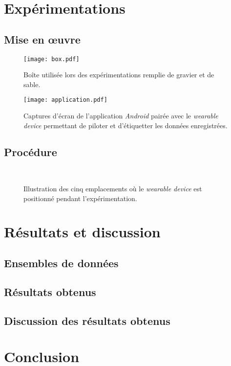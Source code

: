 \section{Expérimentations}

\subsection{Mise en \oe{}uvre}

\begin{figure}[H]
	\centering
	\texttt{[image: box.pdf]}
        \caption{Boîte utilisée lors des expérimentations remplie de gravier et de sable.}
	\label{fig:box}
\end{figure}

\begin{figure}[H]
	\centering
	\texttt{[image: application.pdf]}
        \caption{Captures d'écran de l'application \textit{Android} pairée avec le \textit{wearable device} permettant de piloter et d'étiquetter les données enregistrées.}
	\label{fig:application}
\end{figure}

\subsection{Procédure}

\begin{figure}[H]
    \centering
    \\[30pt]
    \caption{Illustration des cinq emplacements où le \textit{wearable device} est positionné pendant l'expérimentation.}
    \label{fig:positions}
\end{figure}

\section{Résultats et discussion}

\subsection{Ensembles de données}

\subsection{Résultats obtenus}

\subsection{Discussion des résultats obtenus}

\section{Conclusion}